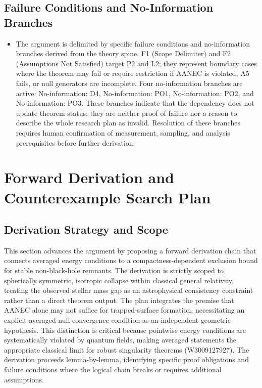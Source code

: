 \documentclass[conference]{IEEEtran}
\begin{document}
\subsection{Failure Conditions and No-Information Branches}
\begin{itemize}
\item The argument is delimited by specific failure conditions and no-information branches derived from the theory spine. F1 (Scope Delimiter) and F2 (Assumptions Not Satisfied) target P2 and L2; they represent boundary cases where the theorem may fail or require restriction if AANEC is violated, A5 fails, or null generators are incomplete. Four no-information branches are active: No-information: D4, No-information: PO1, No-information: PO2, and No-information: PO3. These branches indicate that the dependency does not update theorem status; they are neither proof of failure nor a reason to describe the whole research plan as invalid. Resolution of these branches requires human confirmation of measurement, sampling, and analysis prerequisites before further derivation.
\end{itemize}

\section{Forward Derivation and Counterexample Search Plan}
\subsection{Derivation Strategy and Scope}
This section advances the argument by proposing a forward derivation chain that connects averaged energy conditions to a compactness-dependent exclusion bound for stable non-black-hole remnants. The derivation is strictly scoped to spherically symmetric, isotropic collapse within classical general relativity, treating the observed stellar mass gap as an astrophysical consistency constraint rather than a direct theorem output. The plan integrates the premise that AANEC alone may not suffice for trapped-surface formation, necessitating an explicit averaged null-convergence condition as an independent geometric hypothesis. This distinction is critical because pointwise energy conditions are systematically violated by quantum fields, making averaged statements the appropriate classical limit for robust singularity theorems (W3009127927). The derivation proceeds lemma-by-lemma, identifying specific proof obligations and failure conditions where the logical chain breaks or requires additional assumptions.~\cite{cite_0ed84243cf171bc4}
\end{document}

